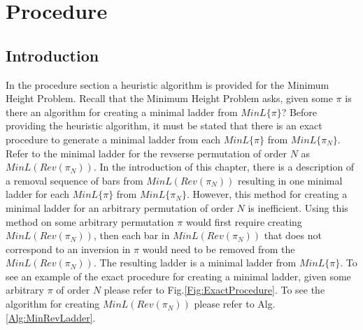 \section{Procedure}

\subsection{Introduction}
In the procedure section a heuristic algorithm is provided for the Minimum Height Problem. Recall that the 
Minimum Height Problem asks, given some $\pi$ is there an algorithm for creating a minimal ladder 
from $MinL\{\pi\}$? Before providing the heuristic algorithm, it must be stated that there is an exact  
procedure to generate a minimal ladder from each $MinL\{\pi\}$ from $MinL\{\pi_{N}\}$. Refer to the minimal ladder for the revserse permutation 
of order $N$ as $MinL(Rev(\pi_{N}))$. In the introduction of this chapter, there 
is a description of a removal sequence of bars from $MinL(Rev(\pi_{N}))$ resulting in one  
minimal ladder for each $MinL\{\pi\}$ from $MinL\{\pi_{N}\}$. However, this method for creating a minimal ladder for an arbitrary 
permutation of order $N$ is inefficient. 
Using this method on some arbitrary permutation $\pi$ would first require creating $MinL(Rev(\pi_{N}))$, then each bar in $MinL(Rev(\pi_{N}))$ that 
does not correspond to an inversion in $\pi$ would need to be removed from the $MinL(Rev(\pi_{N}))$. 
The resulting ladder is a minimal ladder from $MinL\{\pi\}$. To see an example of the exact procedure 
for creating a minimal ladder, given some arbitrary $\pi$ of order $N$ please refer to Fig.\ref{Fig:ExactProcedure}. To see 
the algorithm for creating $MinL(Rev(\pi_{N}))$ please refer to Alg.\ref{Alg:MinRevLadder}.\pagebreak

